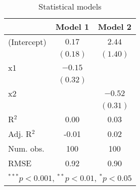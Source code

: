 
\begin{table}
\begin{center}
\begin{tabular}{l c c }
\hline
 & Model 1 & Model 2 \\
\hline
(Intercept) & $0.17$   & $2.44$   \\
            & $(0.18)$ & $(1.40)$ \\
x1          & $-0.15$  &          \\
            & $(0.32)$ &          \\
x2          &          & $-0.52$  \\
            &          & $(0.31)$ \\
\hline
R$^2$       & 0.00     & 0.03     \\
Adj. R$^2$  & -0.01    & 0.02     \\
Num. obs.   & 100      & 100      \\
RMSE        & 0.92     & 0.90     \\
\hline
\multicolumn{3}{l}{\scriptsize{$^{***}p<0.001$, $^{**}p<0.01$, $^*p<0.05$}}
\end{tabular}
\caption{Statistical models}
\label{table:coefficients}
\end{center}
\end{table}
